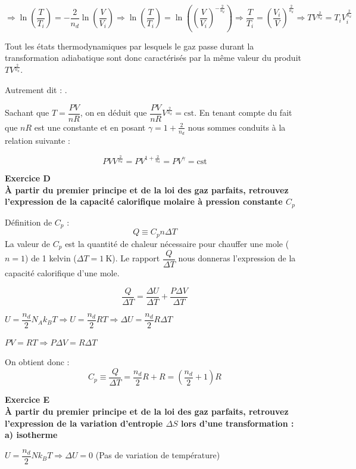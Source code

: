 \documentclass	[11pt, a4paper, openany]{book}
\newcommand{\cst}{\text{cst}}
\newcommand{\exerc}[2]{\textbf{\Large Exercice #1\normalsize \\#2}}
\begin{document}
	$\Rightarrow \ln \left(\dfrac{T}{T_i}\right) = -\dfrac{2}{n_d} \ln \left(\dfrac{V}{V_i}\right) \Rightarrow \ln \left(\dfrac{T}{T_i}\right) =  \ln \left(\left(\dfrac{V}{V_i}\right)^{-\frac{2}{n_d}}\right) \Rightarrow \dfrac{T}{T_i} = \left(\dfrac{V_i}{V}\right)^{\frac{2}{n_d}} \Rightarrow TV^{\frac{2}{n_d}} = T_i V_i^{\frac{2}{n_d}}$
	
	Tout les états thermodynamiques par lesquels le gaz passe durant la transformation adiabatique sont donc caractérisés par la même valeur du produit $TV^{\frac{2}{n_d}}$.
	
	Autrement dit : \fbox{$TV^{\frac{2}{n_d}}=\cst$}.
	
	Sachant que $T = \dfrac{PV}{nR}$, on en déduit que $\dfrac{PV}{nR}V^{\frac{2}{n_d}} = \cst$. En tenant compte du fait que $nR$ est une constante et en posant $\gamma=1+\frac{2}{n_d}$ nous sommes conduits à la relation suivante :
	
	$$PV V^{\frac{2}{n_d}} = PV^{1+\frac{2}{n_d}}= PV^\gamma=\cst $$

\vspace{0,5cm}

\exerc{D}{À partir du premier principe et de la loi des gaz parfaits, retrouvez l’expression de la
capacité calorifique molaire à pression constante $C_p$}
	
	Définition de $C_p$ : $$Q \equiv C_p n \Delta T$$ La valeur de $C_p$ est la quantité de chaleur nécessaire pour chauffer une mole ($n=1$) de 1 kelvin ($\Delta T = 1\ \text{K}$). Le rapport $\dfrac{Q}{\Delta T}$ nous donneras l'expression de la capacité calorifique d'une mole.
	
	$$ \frac{Q}{\Delta T} = \frac{\Delta U}{\Delta T} + \frac{P\Delta V}{\Delta T}$$
	
	$U = \dfrac{n_d}{2}N_Ak_BT \Rightarrow U = \dfrac{n_d}{2}RT \Rightarrow \Delta U = \dfrac{n_d}{2}R\Delta T$
	
	$ PV = RT \Rightarrow P \Delta V = R \Delta T$
	
	On obtient donc : $$ C_p \equiv \frac{Q}{\Delta T} = \frac{n_d}{2}R + R = (\frac{n_d}{2}+1) R$$

\vspace{0,5cm}

\exerc{E}{À partir du premier principe et de la loi des gaz parfaits, retrouvez l’expression de la variation d'entropie $\Delta S$ lors d'une transformation : \\a) isotherme}
	
		$ U = \dfrac{n_d}{2}Nk_BT \Rightarrow \Delta U = 0$ (Pas de variation de température)
		
\end{document}
